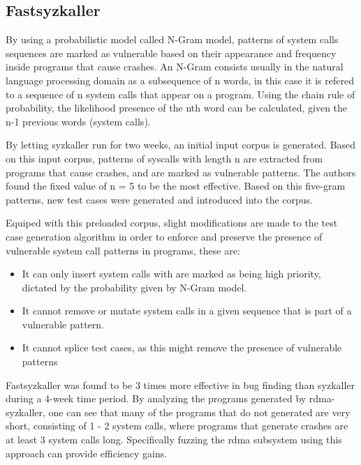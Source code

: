 


\subsection{Fastsyzkaller}

By using a probabilistic model called N-Gram model, patterns of system calls sequences are marked as vulnerable based on their appearance and
frequency inside programs that cause crashes. An N-Gram consists usually in the natural language processing domain as a subsequence
of n words, in this case it is refered to a sequence of n system calls that appear on a program. Using the chain rule
of probability, the likelihood presence of the nth word can be calculated, given the n-1 previous words (system calls).

By letting syzkaller run for two weeks, an initial input corpus is generated. Based on this input corpus,
patterns of syscalls with length n are extracted from programs that cause crashes, and are marked as vulnerable
patterns. The authors found the fixed value of n = 5 to be the most effective\cite{liFastSyzkallerImprovingFuzz2019}.
Based on this five-gram patterns, new test cases were generated and introduced into the corpus.

Equiped with this preloaded corpus, slight modifications are made to the test case generation algorithm in order
to enforce and preserve the presence of vulnerable system call patterns in programs, these are:

\begin{itemize}
  \item It can only insert system calls with are marked as being high priority, dictated by the probability given by N-Gram model.
  \item It cannot remove or mutate system calls in a given sequence that is part of a vulnerable pattern.
  \item It cannot splice test cases, as this might remove the presence of vulnerable patterns
\end{itemize}

Fastsyzkaller was found to be 3 times more effective in bug finding than syzkaller during a 4-week time period.
By analyzing the programs generated by rdma-syzkaller, one can see that many of the programs that do not generated are very short, consisting
of 1 - 2 system calls, where programs that generate crashes are at least 3 system calls long. Specifically fuzzing the rdma subsystem using this
approach can provide efficiency gains.



